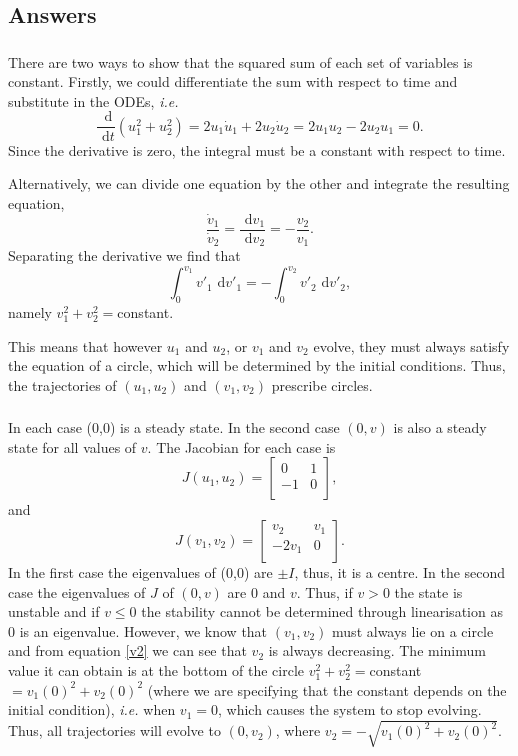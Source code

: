 \documentclass[]{article}
\newcommand{\bb}{\begin{equation}}
\newcommand{\ee}{\end{equation}}
\newcommand{\rd}{\text{ d}}
\newcommand{\eqn}[1]{equation \eqref{#1}}
\newcommand{\ie}{\emph{i.e.} }
\begin{document}
\begin{Answ}
\subsection{Answers}
\subsubsection{}
There are two ways to show that the squared sum of each set of variables is constant. Firstly, we could differentiate the sum with respect to time and substitute in the ODEs, \ie
\bb
\frac{\rd}{\rd t}(u_1^2+u_2^2)=2u_1\dot{u}_1+2u_2\dot{u}_2=2u_1u_2-2u_2u_1=0.
\ee
Since the derivative is zero, the integral must be a constant with respect to time.

Alternatively, we can divide one equation by the other and integrate the resulting equation,
\bb
\frac{\dot{v}_1}{\dot{v}_2}=\frac{\rd v_1}{\rd v_2}=-\frac{v_2}{v_1}.
\ee
Separating the derivative we find that
\bb
\int^{v_1}_0 v'_1\rd v'_1=-\int^{v_2}_0 v'_2\rd v'_2,
\ee
namely $v^2_1+v^2_2=$constant.

This means that however $u_1$ and $u_2$, or $v_1$ and $v_2$ evolve, they must always satisfy the equation of a circle, which will be determined by the initial conditions. Thus,  the trajectories of $(u_1,u_2)$ and $(v_1,v_2)$  prescribe circles.

\subsubsection{}
In each case (0,0) is a steady state. In the second case $(0,v)$ is also a steady state for all values of $v$. The Jacobian for each case is
\bb
J(u_1,u_2)=\left[ {\begin{array}{cc}
   0&1 \\
  -1 & 0 \\
  \end{array} } \right],
\ee
and
\bb
J(v_1,v_2)=\left[ {\begin{array}{cc}
  v_2&v_1 \\
  -2v_1 & 0 \\
  \end{array} } \right].
\ee
In the first case the eigenvalues of (0,0) are $\pm I$, thus, it is a centre. In the second case the eigenvalues of $J$ of $(0,v)$ are 0 and $v$. Thus, if $v>0$ the state is unstable and if $v\leq0$ the stability cannot be determined through linearisation as 0 is an eigenvalue. However, we know that $(v_1,v_2)$ must always lie on a circle and from \eqn{v2} we can see that $v_2$ is always decreasing. The minimum value it can obtain is at the bottom of the circle $v_1^2+v_2^2=$constant$=v_1(0)^2+v_2(0)^2$ (where we are specifying that the constant depends on the initial condition), \ie when $v_1=0$, which causes the system to stop evolving. Thus, all trajectories will evolve to $(0,v_2)$, where $v_2=-\sqrt{v_1(0)^2+v_2(0)^2}$.
\end{Answ}
\end{document}
